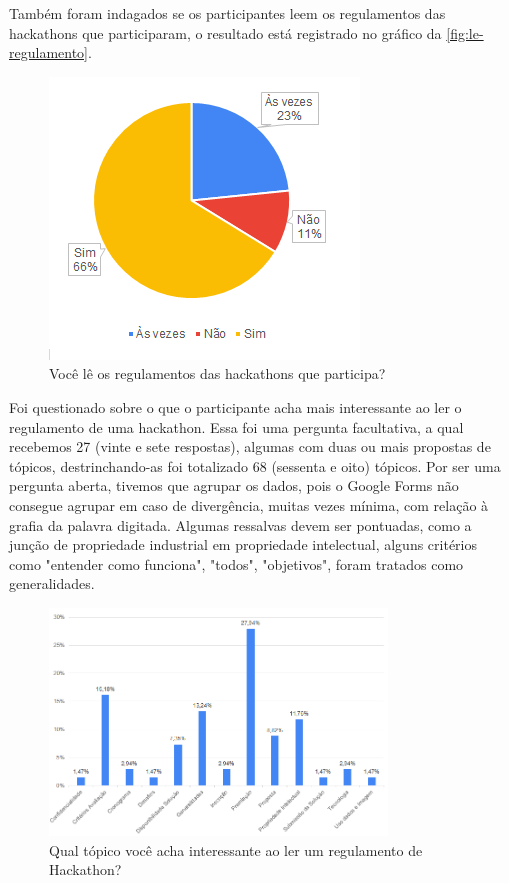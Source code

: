 Também foram indagados se os participantes leem os regulamentos das hackathons que participaram, o resultado está registrado no gráfico da \autoref{fig:le-regulamento}. %

\begin{figure}[H]
    \centering
    \includegraphics{images/Grafico-leitura-regulamentos.png}
    \caption{Você lê os regulamentos das hackathons que participa?}%
    \label{fig:le-regulamento}
\end{figure}


Foi questionado sobre o que o participante acha mais interessante ao ler o regulamento de uma hackathon. Essa foi uma pergunta facultativa, a qual recebemos 27 (vinte e sete respostas), algumas com duas ou mais propostas de tópicos, destrinchando-as foi totalizado 68 (sessenta e oito) tópicos. Por ser uma pergunta aberta, tivemos que agrupar os dados, pois o Google Forms não consegue agrupar em caso de divergência, muitas vezes mínima, com relação à grafia da palavra digitada. %
Algumas ressalvas devem ser pontuadas, como a junção de propriedade industrial em propriedade intelectual, alguns critérios como "entender como funciona", "todos", "objetivos", foram tratados como generalidades.

\begin{figure}[H]
    \centering
    \includegraphics[width=0.8\textwidth]{images/topico-interessante.png}
    \caption{Qual tópico você acha interessante ao ler um regulamento de Hackathon?}%
    \label{fig:topico-interessante}
\end{figure}


